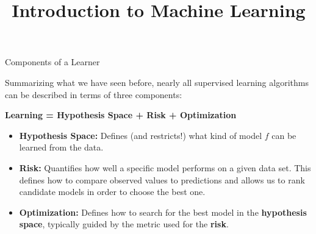 \documentclass[11pt,compress,t,notes=noshow, xcolor=table]{beamer}
\title{Introduction to Machine Learning}
\institute{\href{https://compstat-lmu.github.io/lecture_i2ml/}{compstat-lmu.github.io/lecture\_i2ml}}
\date{}
\begin{document}









\begin{vbframe}{Components of a Learner}

Summarizing what we have seen before, nearly all supervised learning algorithms 
can be described in terms of three components:

\lz

\begin{center}

  \textbf{Learning = Hypothesis Space + Risk + Optimization}
  
\end{center}

\lz

\begin{itemize}

  \item \textbf{Hypothesis Space:} Defines (and restricts!) what kind of model 
  $f$ can be learned from the data.
  
  \item \textbf{Risk:} Quantifies how well a specific model performs on a given 
  data set. This defines how to compare observed values to predictions and 
  allows us to rank candidate models in order to choose the best one.
  
  \item \textbf{Optimization:} Defines how to search for the best model in the 
  \textbf{hypothesis space}, typically guided by the metric used for the 
  \textbf{risk}.
  
\end{itemize}

\end{vbframe}

\end{document}
